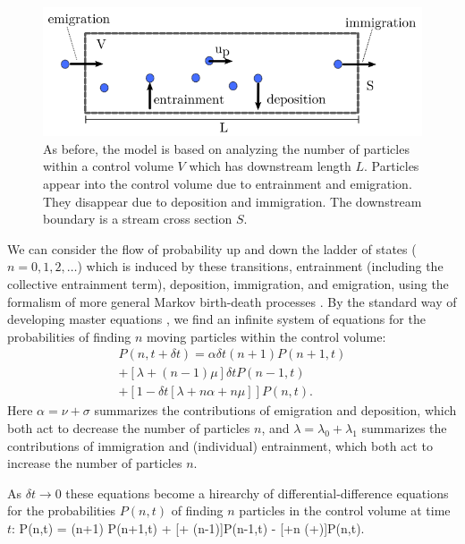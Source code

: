 \begin{figure}
  \includegraphics[width=.98\linewidth]{./figures/controlvol.png}
  \caption{As before, the model is based on analyzing the number of particles within a control volume $V$ which has downstream length $L$. Particles appear into the control volume due to entrainment and emigration. They disappear due to deposition and immigration. The downstream boundary is a stream cross section $S$.  \label{fig:anceywindow} }
\end{figure} 

We can consider the flow of probability up and down the ladder of states ($n=0,1,2,\dots$) which is induced by these transitions, entrainment (including the collective entrainment term), deposition, immigration, and emigration, using the formalism of more general Markov birth-death processes \citep{Cox1965, Pielou1977}. 
By the standard way of developing master equations \citep[e.g.][]{Cox1965}, we find an infinite system of equations for the probabilities of finding $n$ moving particles within the control volume: 
\begin{multline} P(n,t+\delta t) = \alpha \delta t (n+1)P(n+1,t) \\+  [\lambda + (n-1)\mu]\delta t P(n-1,t) \\ + [1-\delta t[\lambda + n\alpha + n\mu]]P(n,t). \end{multline}
Here $\alpha = \nu + \sigma$ summarizes the contributions of emigration and deposition, which both act to decrease the number of particles $n$, and $\lambda = \lambda_0 + \lambda_1$ summarizes the contributions of immigration and (individual) entrainment, which both act to increase the number of particles $n$. 

As $\delta t\rightarrow 0$ these equations become a hirearchy of differential-difference equations for the probabilities $P(n,t)$ of finding $n$ particles in the control volume at time $t$: 
\be {}P(n,t) = (n+1) \alpha P(n+1,t) + [\lambda + (n-1)\mu]P(n-1,t) - [\lambda +n (\alpha+\mu)]P(n,t). \label{eq:anc2008} \ee 


